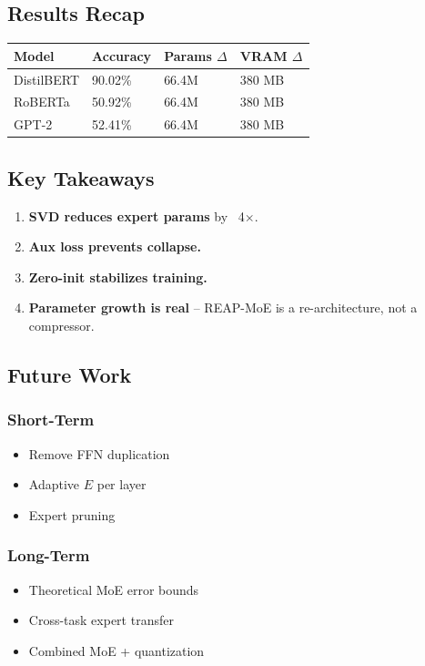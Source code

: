 \subsection{Results Recap}

\begin{table}[H]
\centering
\small
\begin{tabular}{llll}
\toprule
\textbf{Model} & \textbf{Accuracy} & \textbf{Params $\Delta$} & \textbf{VRAM $\Delta$} \\
\midrule
DistilBERT & 90.02\% & 66.4M & 380 MB \\
RoBERTa & 50.92\% & 66.4M & 380 MB \\
GPT-2 & 52.41\% & 66.4M & 380 MB \\
\bottomrule
\end{tabular}
\end{table}

\subsection{Key Takeaways}

\begin{enumerate}
\item \textbf{SVD reduces expert params} by ~4$\times$.
\item \textbf{Aux loss prevents collapse.}
\item \textbf{Zero-init stabilizes training.}
\item \textbf{Parameter growth is real} -- REAP-MoE is a re-architecture, not a
  compressor.

\end{enumerate}
\subsection{Future Work}

\subsubsection{Short-Term}
\begin{itemize}
\item Remove FFN duplication
\item Adaptive $E$ per layer
\item Expert pruning

\end{itemize}
\subsubsection{Long-Term}
\begin{itemize}
\item Theoretical MoE error bounds
\item Cross-task expert transfer
\item Combined MoE + quantization

\end{itemize}
